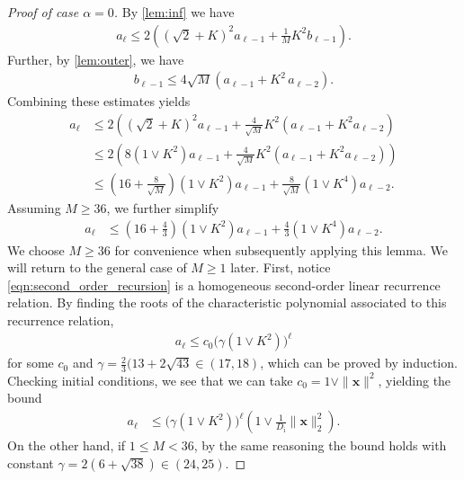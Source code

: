 \documentclass[twoside]{article}
\renewcommand{\ss}[1]{_{\text{#1}}}
\newcommand{\vx}{\mathbf{x}}
\renewcommand{\ss}[1]{_{\text{#1}}}        %
\theoremstyle{theoremstyle}
\begin{document}
\begin{proof}[Proof of case $\alpha = 0$]
    By \cref{lem:inf} we have
    \begin{align}
        a_\ell \leq  2\left((\sqrt{2}+K)^2
                a_{\ell-1} 
                + \tfrac1M K^2 b_{\ell-1} \right).
    \end{align}
    Further, by \cref{lem:outer}, we have
    \begin{align}
        b_{\ell-1} \leq 4\sqrt{M}(a_{\ell-1}
                    + K^2\, a_{\ell-2}) .
    \end{align}
    Combining these estimates yields
    \begin{align}
         a_\ell &\leq  2\left((\sqrt{2}+K)^2
                a_{\ell-1}
                + \tfrac{4}{\sqrt{M}} K^2 \left(a_{\ell-1}
                    + K^2 a_{\ell-2}\right. \right) \\
            & \leq       2\left(8(1\lor K^2)
                 a_{\ell-1}
                + \tfrac{4}{\sqrt{M}} K^2 \left(a_{\ell-1}
                    + K^2 a_{\ell-2}\right) \right) \\
             & \le
                (16+\tfrac8{\sqrt{M}}) (1 \lor K^2) a_{\ell-1}
                + \tfrac8{\sqrt{M}} (1 \lor K^4) a_{\ell-2}.
    \end{align}
    Assuming $M \ge 36$, we further simplify
    \begin{align}
         a_\ell
         &\leq
            (16+\tfrac43) (1 \lor K^2) a_{\ell-1}
            + \tfrac43 (1 \lor K^4) a_{\ell-2}. \label{eqn:second_order_recursion}
    \end{align}
    We choose $M \ge 36$ for convenience when subsequently applying this lemma. We will return to the general case of $M \ge 1$ later. First, notice 
    \cref{eqn:second_order_recursion} is a homogeneous second-order linear recurrence relation.
    By finding the roots of the characteristic polynomial associated to this recurrence relation,  
    \begin{align}
        a_{\ell} \leq c_0\Big(\gamma (1 \lor K^2)\Big)^{\ell} %
    \end{align}
    for some $c_0$ and $\gamma = \tfrac23(13+2\sqrt{43} \in (17,18)$, which can be proved by induction. Checking initial conditions, we see that we can take $c_0 = 1\lor \|\vx\|^2 $, yielding the bound
    \begin{align}
          a_{\ell}
          &\leq \Big(\gamma(1 \lor K^2)\Big)^{\ell} (1\lor \tfrac1{D\ss{i}} \|\vx\|^2_2).
    \end{align}
    On the other hand, if $1 \le M < 36$, by the same reasoning the bound holds with constant $\gamma = 2(6+\sqrt{38}) \in (24,25)$.
\end{proof}
\end{document}
